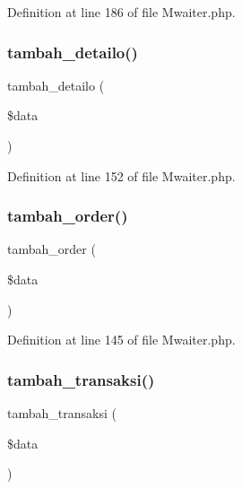 Definition at line 186 of file Mwaiter.\+php.

\mbox{\label{class_mwaiter_a8cb5db96c9950be16b2f23d67501bf44}} 
\subsubsection{\texorpdfstring{tambah\_detailo()}{tambah\_detailo()}}
{\footnotesize\ttfamily tambah\+\_\+detailo (\begin{DoxyParamCaption}\item[{}]{\$data }\end{DoxyParamCaption})}



Definition at line 152 of file Mwaiter.\+php.

\mbox{\label{class_mwaiter_a942758017dc79d0d59bf4ba7b09d0b53}} 
\subsubsection{\texorpdfstring{tambah\_order()}{tambah\_order()}}
{\footnotesize\ttfamily tambah\+\_\+order (\begin{DoxyParamCaption}\item[{}]{\$data }\end{DoxyParamCaption})}



Definition at line 145 of file Mwaiter.\+php.

\mbox{\label{class_mwaiter_a714bedce1322d287bcfb93295feddb9c}} 
\subsubsection{\texorpdfstring{tambah\_transaksi()}{tambah\_transaksi()}}
{\footnotesize\ttfamily tambah\+\_\+transaksi (\begin{DoxyParamCaption}\item[{}]{\$data }\end{DoxyParamCaption})}



